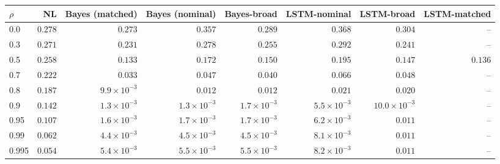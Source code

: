 \begin{tabular}{lrrrrrrr}
\toprule
$\rho$ & NL & Bayes (matched) & Bayes (nominal) & Bayes-broad & LSTM-nominal & LSTM-broad & LSTM-matched \\
\midrule
0.0 & $0.278$ & $0.273$ & $0.357$ & $0.289$ & $0.368$ & $0.304$ & -- \\
0.3 & $0.271$ & $0.231$ & $0.278$ & $0.255$ & $0.292$ & $0.241$ & -- \\
0.5 & $0.258$ & $0.133$ & $0.172$ & $0.150$ & $0.195$ & $0.147$ & $0.136$ \\
0.7 & $0.222$ & $0.033$ & $0.047$ & $0.040$ & $0.066$ & $0.048$ & -- \\
0.8 & $0.187$ & $9.9\!\times\!10^{-3}$ & $0.012$ & $0.012$ & $0.021$ & $0.020$ & -- \\
0.9 & $0.142$ & $1.3\!\times\!10^{-3}$ & $1.3\!\times\!10^{-3}$ & $1.7\!\times\!10^{-3}$ & $5.5\!\times\!10^{-3}$ & $10.0\!\times\!10^{-3}$ & -- \\
0.95 & $0.107$ & $1.6\!\times\!10^{-3}$ & $1.7\!\times\!10^{-3}$ & $1.7\!\times\!10^{-3}$ & $6.2\!\times\!10^{-3}$ & $0.011$ & -- \\
0.99 & $0.062$ & $4.4\!\times\!10^{-3}$ & $4.5\!\times\!10^{-3}$ & \textit{$4.5\!\times\!10^{-3}$} & $8.1\!\times\!10^{-3}$ & \textit{$0.011$} & -- \\
0.995 & $0.054$ & $5.4\!\times\!10^{-3}$ & $5.5\!\times\!10^{-3}$ & \textit{$5.5\!\times\!10^{-3}$} & $8.2\!\times\!10^{-3}$ & \textit{$0.011$} & -- \\
\bottomrule
\end{tabular}